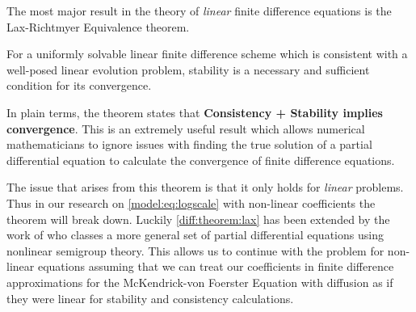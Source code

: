 \documentclass[../main.tex]{subfiles}
\begin{document}
  The most major result in the theory of \emph{linear} finite difference equations is the  Lax-Richtmyer Equivalence theorem.

  \begin{theorem}\label{diff:theorem:lax}
    For a uniformly solvable linear finite difference scheme which is consistent with a well-posed linear evolution problem, stability is a necessary and sufficient condition for its convergence.
  \end{theorem}

  In plain terms, the theorem states that \textbf{Consistency + Stability implies convergence}. This is an extremely useful result which allows numerical mathematicians to ignore issues with finding the true solution of a partial differential equation to calculate the convergence of finite difference equations.

  The issue that arises from this theorem is that it only holds for \emph{linear} problems. Thus in our research on \autoref{model:eq:logscale} with non-linear coefficients the theorem will break down. Luckily \autoref{diff:theorem:lax} has been extended by the work of \cite{rosinger2008} who classes a more general set of partial differential equations using nonlinear semigroup theory. This allows us to continue with the problem for non-linear equations assuming that we can treat our coefficients in finite difference approximations for the McKendrick-von Foerster Equation with diffusion as if they were linear for stability and consistency calculations.  
\end{document}
